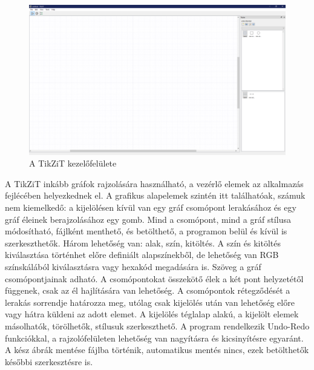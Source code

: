 \begin{figure}[!h]
	\includegraphics[width=\textwidth]{images/tikzit.png}
	\caption{A TikZiT kezelőfelülete \cite{tikzit}}
	\label{fig:tikzit}
\end{figure}
A TikZiT inkább gráfok rajzolására használható, a vezérlő elemek az alkalmazás fejlécében helyezkednek el. A grafikus alapelemek szintén itt találhatóak, számuk nem kiemelkedő: a kijelölésen kívül van egy gráf csomópont lerakásához és egy gráf éleinek berajzolásához egy gomb. Mind a csomópont, mind a gráf stílusa módosítható, fájlként menthető, és betölthető, a programon belül és kívül is szerkeszthetők. Három lehetőség van: alak, szín, kitöltés. A szín és kitöltés kiválasztása történhet előre definiált alapszínekből, de lehetőség van RGB színskálából kiválasztásra vagy hexakód megadására is. Szöveg a gráf csomópontjainak adható. A csomópontokat összekötő élek a két pont helyzetétől függenek, csak az él hajlítására van lehetőség. A csomópontok rétegződését a lerakás sorrendje határozza meg, utólag csak kijelölés után van lehetőség előre vagy hátra küldeni az adott elemet. A kijelölés téglalap alakú, a kijelölt elemek másolhatók, törölhetők, stílusuk szerkeszthető.  A program rendelkezik Undo-Redo funkciókkal, a rajzolófelületen lehetőség van nagyításra és kicsinyítésre egyaránt. A kész ábrák mentése fájlba történik, automatikus mentés nincs, ezek betölthetők későbbi szerkesztésre is. 

